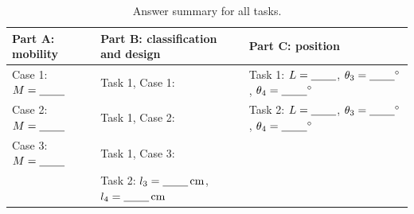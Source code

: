 \documentclass[11pt,a4paper]{article}
\newcommand{\shortblank}{\underline{\hspace{0.8cm}}}
\begin{document}
\begin{table}[H]
  \centering
  \caption{Answer summary for all tasks.}
  \small
  \begin{tabularx}{\linewidth}{@{}XXX@{}}
    \toprule
    Part A: mobility & Part B: classification and design & Part C: position\\
    \midrule
    Case 1: $M=\shortblank$ & Task 1, Case 1: \shortblank & Task 1: $L=\shortblank$, $\theta_3=\shortblank^\circ$, $\theta_4=\shortblank^\circ$\\
    Case 2: $M=\shortblank$ & Task 1, Case 2: \shortblank & Task 2: $L=\shortblank$, $\theta_3=\shortblank^\circ$, $\theta_4=\shortblank^\circ$\\
    Case 3: $M=\shortblank$ & Task 1, Case 3: \shortblank & \\
    & Task 2: $l_3=\shortblank\,\mathrm{cm}$, $l_4=\shortblank\,\mathrm{cm}$ & \\
    \bottomrule
  \end{tabularx}
\end{table}

\end{document}
